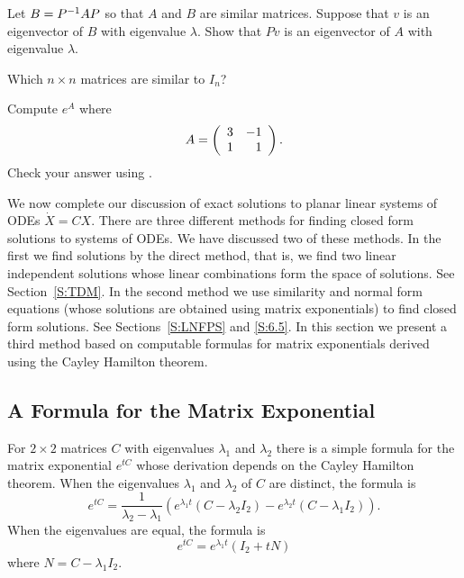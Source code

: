 \begin{exercise} \label{c6.5.4}
Let $B=P^{-1} AP$ so that $A$ and $B$ are similar matrices.  Suppose
that $v$ is an eigenvector of $B$ with eigenvalue $\lambda$.  Show
that $Pv$ is an eigenvector of $A$ with eigenvalue $\lambda$.
\end{exercise}

\begin{exercise} \label{c6.5.5}
Which $n\times n$ matrices are similar to $I_n$?
\end{exercise}

\begin{exercise} \label{c6.5.6}
Compute $e^A$ where
\[
A = \left(\begin{array}{rr} 3 & -1\\ 1 &1\end{array}\right).
\]
Check your answer using \Matlabp.
\end{exercise}


\label{S:6.6}

We now complete our discussion of exact solutions to planar linear systems of
ODEs $\dot{X}=CX$.  There are three different methods for finding closed form
solutions to systems of ODEs.  We have discussed two of these methods.  In
the first we find solutions by the direct method, that is, we find two linear
independent solutions whose linear combinations form the space of solutions.
See Section~\ref{S:TDM}.  In the second method we use similarity and normal
form equations (whose solutions are obtained using matrix exponentials) to
find closed form solutions.  See Sections~\ref{S:LNFPS} and \ref{S:6.5}.
In this section we present a third method based on computable formulas for
matrix exponentials derived using the Cayley Hamilton theorem.

\subsection*{A Formula for the Matrix Exponential}

For $2\times 2$ matrices $C$ with eigenvalues $\lambda_1$ and $\lambda_2$
there is a simple formula for the matrix exponential $e^{tC}$ whose
derivation depends on the Cayley Hamilton theorem.   When the eigenvalues $\lambda_1$ and $\lambda_2$ of $C$ are
distinct, the formula is
\begin{equation}  \label{E:exdist}
e^{tC} = \frac{1}{\lambda_2-\lambda_1}\left(e^{\lambda_1 t}(C-\lambda_2I_2) -
e^{\lambda_2 t}(C-\lambda_1I_2)\right).
\end{equation}
When the eigenvalues are equal, the formula is
\begin{equation}  \label{E:exeq}
e^{tC} = e^{\lambda_1 t}(I_2 + tN)
\end{equation}
where $N = C - \lambda_1I_2$.

